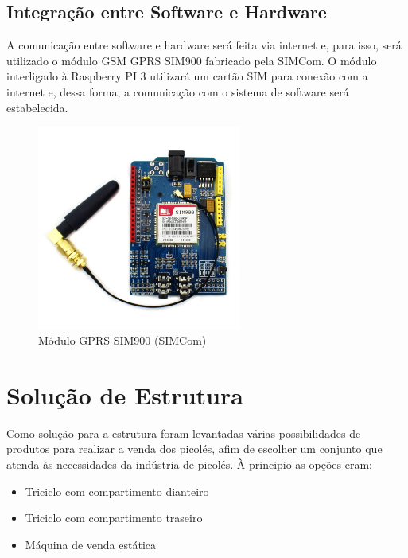 \subsection{Integração entre Software e Hardware}
A comunicação entre software e hardware será feita via internet e, para isso, será utilizado o módulo GSM GPRS SIM900 fabricado pela SIMCom. O módulo interligado à Raspberry PI 3 utilizará um cartão SIM para conexão com a internet e, dessa forma, a comunicação com o sistema de software será estabelecida.

\begin{figure}[H]
	\centering
    \includegraphics[width=0.6\textwidth]{figuras/modulo_gprs}
    \caption{Módulo GPRS SIM900 (SIMCom)}
    \label{fig:modulo_gprs}
\end{figure}

\section{Solução de Estrutura}
Como solução para a estrutura foram levantadas várias possibilidades de produtos para realizar a venda dos picolés, afim de escolher um conjunto que atenda às necessidades da indústria de picolés. À principio as opções eram:

\begin{itemize}
\item Triciclo com compartimento dianteiro
\item Triciclo com compartimento traseiro
\item Máquina de venda estática
\end{itemize} 

